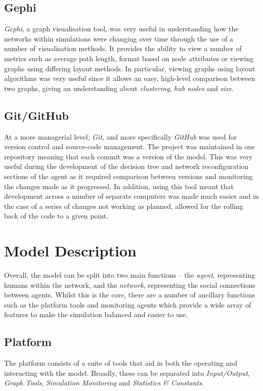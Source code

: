 \documentclass[]{report}
\begin{document}
\subsection{Gephi}
\emph{Gephi}, a graph visualisation tool, was very useful in understanding how the networks within simulations were changing over time through the use of a number of visualisation methods. It provides the ability to view a number of metrics such as average path length, format based on node attributes or viewing graphs using differing layout methods. In particular, viewing graphs using layout algorithms was very useful since it allows an easy, high-level comparison between two graphs, giving an understanding about \emph{clustering}, \emph{hub nodes} and \emph{size}.

\subsection{Git/GitHub}
At a more managerial level, \emph{Git}, and more specifically \emph{GitHub} was used for version control and source-code management. The project was maintained in one repository meaning that each commit was a version of the model. This was very useful during the development of the decision tree and network reconfiguration sections of the agent as it required comparison between versions and monitoring the changes made as it progressed. In addition, using this tool meant that development across a number of separate computers was made much easier and in the case of a series of changes not working as planned, allowed for the rolling back of the code to a given point.

\section{Model Description}
Overall, the model can be split into two main functions – the \emph{agent}, representing humans within the network, and the \emph{network}, representing the social connections between agents. Whilst this is the core, there are a number of ancillary functions such as the platform tools and monitoring agents which provide a wide array of features to make the simulation balanced and easier to use.

\subsection{Platform}
\label{sec:platform}
The platform consists of a suite of tools that aid in both the operating and interacting with the model. Broadly, these can be separated into \emph{Input/Output}, \emph{Graph Tools}, \emph{Simulation Monitoring} and \emph{Statistics \& Constants}.
\end{document}
